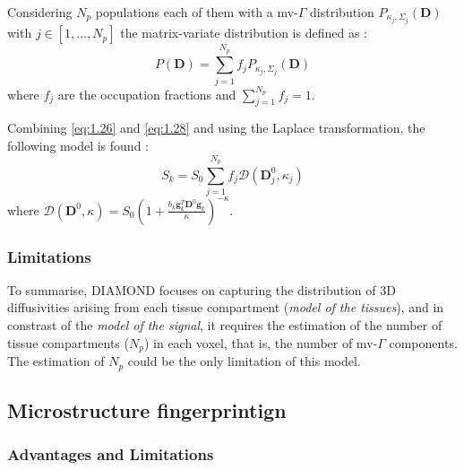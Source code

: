  Considering $N_p$ populations each of them with a mv-$\Gamma$ distribution $P_{\kappa_j,\Sigma_j}(\mathbf{D})$ with $j \in [1,...,N_p]$ the matrix-variate distribution is defined as \cite{scherrer2016diamond}:
 \begin{equation}\label{eq:1.28}
   P(\mathbf{D}) = \sum_{j=1}^{N_p} f_j P_{\kappa_j,\Sigma_j}(\mathbf{D})
 \end{equation} 
 where $f_j$ are the occupation fractions and $\sum_{j=1}^{N_p} f_j = 1$. 

 \begin{figure}[h]
   \centering
   \caption{}
   \label{fig:heterogeneous_compartments_diamond}
 \end{figure}

 Combining \ref{eq:1.26} and \ref{eq:1.28} and using the Laplace transformation, the following model is found \cite{scherrer2016diamond}:
 \begin{equation}
   S_k=S_0 \sum_{j=1}^{N_p} f_j \mathcal{D}(\mathbf{D}^0_j, \kappa_j)
 \end{equation}
 where $\mathcal{D}(\mathbf{D}^0,\kappa) = S_0 (1+\frac{b_k\mathbf{g}_k^T\mathbf{D}^0\mathbf{g}_k}{\kappa})^{-\kappa}$.

  \subsubsection*{Limitations}
  To summarise, DIAMOND focuses on capturing the distribution of 3D diffusivities arising from each tissue compartment (\emph{model of the tissues}), and in constrast of the \emph{model of the signal}, it requires the estimation of the number of tissue compartments ($N_p$) in each voxel, that is, the number of mv-$\Gamma$ components. The estimation of $N_p$ could be the only limitation of this model.
 \subsection{Microstructure fingerprintign}
  \subsubsection*{Advantages and Limitations}

